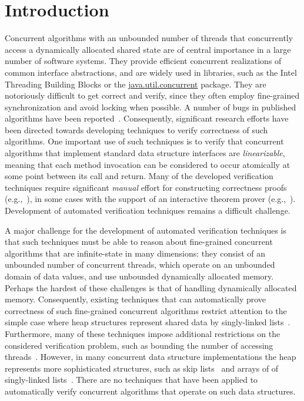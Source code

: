 \section{Introduction}



Concurrent algorithms with an unbounded number of
threads that concurrently access a dynamically allocated shared state
are of central importance in a large number of software systems.
They provide efficient concurrent realizations of
common interface abstractions, and
are widely used in libraries,
such as the Intel Threading Building Blocks or
the \url{java.util.concurrent} package.
They are notoriously difficult to get correct and verify, since they
often employ fine-grained synchronization and avoid locking when
possible. A number of bugs  in published
algorithms have been reported~\cite{DDGJLMMSS:dcas,MiSc:correction}.
Consequently, significant research efforts have been directed towards developing
techniques to verify correctness of such algorithms. One important use
of such techniques is
to verify that concurrent algorithms that implement standard data structure
interfaces are {\em linearizable}, meaning that
each method invocation can be considered to occur atomically at some point
between its call and return.
Many of the developed verification techniques require significant
{\em manual} effort for constructing correctness proofs
(e.g.,~\cite{LF:pldi13,Vafeiadis:Thesis}),
in some cases with the support of an interactive theorem prover
(e.g.,~\cite{Aaron:logical:linearizability,Colvin:Lazy-List,Derrick:fm14,SWD:cav12,SDW:tcl14}).
Development of automated verification techniques remains a difficult challenge.

A major challenge for the development of automated verification techniques
is that such techniques must be
able to reason about fine-grained concurrent algorithms that are infinite-state
in many dimensions:
they consist of an unbounded number of concurrent threads, which
operate on an unbounded domain of data values, and use
unbounded dynamically allocated memory. 
Perhaps the hardest of these challenges is that of handling 
dynamically allocated memory.
Consequently, existing techniques that can automatically prove correctness
of such fine-grained concurrent algorithms restrict attention to the simple
case where heap structures represent shared data by singly-linked 
lists~\cite{AHHR:integrated,meyer:vmcai16,Quy:sas16,Sagiv:correlation,Vafeiadis:cav10}. Furthermore, many of these techniques impose additional restrictions on the considered verification problem, such as bounding the number of accessing
threads~\cite{Amit:comparisonAbstraction,Vechev:spin09,CernyRZCA:CAV10}.
However, in many concurrent data structure implementations the heap represents
more sophisticated structures, such as skip
lists~\cite{Fomitchev:2004,ArtOfMpP,Sundell:2005} and arrays of
of singly-linked lists~\cite{ts-stack}. There are no
techniques that have been applied to automatically verify concurrent algorithms
that operate on such data structures.

